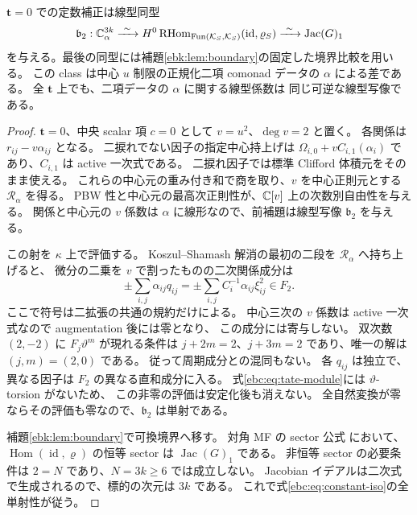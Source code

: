 \begin{proposition}[定数三方向ずつの二項同型]
\label{ebc:prop:constant-iso}
$\mathbf t=0$ での定数補正は線型同型
\begin{equation}\label{ebc:eq:constant-iso}
 \mathfrak b_2:\mathbb C^{3k}_{\alpha}\xrightarrow{\ \sim\ }
 H^0\operatorname{RHom}_{\operatorname{Fun}(\mathcal K_S,\mathcal K_S)}
       (\operatorname{id},\varrho_S)
 \xrightarrow{\ \sim\ }\operatorname{Jac}(G)_1
\end{equation}
を与える。最後の同型には補題\ref{ebk:lem:boundary}の固定した境界比較を用いる。
この class は中心 $u$ 制限の正規化二項 comonad データの $\alpha$ による差である。
全 $\mathbf t$ 上でも、二項データの $\alpha$ に関する線型係数は
同じ可逆な線型写像である。
\end{proposition}

\begin{proof}
$\mathbf t=0$、中央 scalar 項 $c=0$ として $v=u^2$、$\deg v=2$ と置く。
各関係は $r_{ij}-v\alpha_{ij}$ となる。
二捩れでない因子の指定中心持上げは
$\Omega_{i,0}+vC_{i,1}(\alpha_i)$ であり、$C_{i,1}$ は active 一次式である。
二捩れ因子では標準 Clifford 体積元をそのまま使える。
これらの中心元の重み付き和で商を取り、$v$ を中心正則元とする $\mathcal R_\alpha$ を得る。
PBW 性と中心元の最高次正則性が、$\mathbb C[v]$ 上の次数別自由性を与える。
関係と中心元の $v$ 係数は $\alpha$ に線形なので、前補題は線型写像
$\mathfrak b_2$ を与える。

この射を $\kappa$ 上で評価する。
Koszul--Shamash 解消の最初の二段を $\mathcal R_\alpha$ へ持ち上げると、
微分の二乗を $v$ で割ったものの二次関係成分は
\begin{equation}\label{ebc:eq:constant-evaluation}
 \pm\sum_{i,j}\alpha_{ij}q_{ij}
   =\pm\sum_{i,j}C_i^{-1}\alpha_{ij}\xi_{ij}^2
       \in F_2.
\end{equation}
ここで符号は二拡張の共通の規約だけによる。
中心三次の $v$ 係数は active 一次式なので augmentation 後には零となり、
この成分には寄与しない。
双次数 $(2,-2)$ に $F_j\vartheta^m$ が現れる条件は
$j+2m=2$、$j+3m=2$ であり、唯一の解は $(j,m)=(2,0)$ である。
従って周期成分との混同もない。
各 $q_{ij}$ は独立で、異なる因子は $F_2$ の異なる直和成分に入る。
式\eqref{ebc:eq:tate-module}には $\vartheta$-torsion がないため、
この非零の評価は安定化後も消えない。
全自然変換が零ならその評価も零なので、$\mathfrak b_2$ は単射である。

補題\ref{ebk:lem:boundary}で可換境界へ移す。
対角 MF の sector 公式
\cite[Theorem~5.39 and proof, pp.~82--84]{NFBFKKernels}において、
$\operatorname{Hom}(\operatorname{id},\varrho)$ の恒等 sector は
$\operatorname{Jac}(G)_1$ である。
非恒等 sector の必要条件は $2=N$ であり、$N=3k\ge6$ では成立しない。
Jacobian イデアルは二次式で生成されるので、標的の次元は $3k$ である。
これで式\eqref{ebc:eq:constant-iso}の全単射性が従う。


\end{proof}
